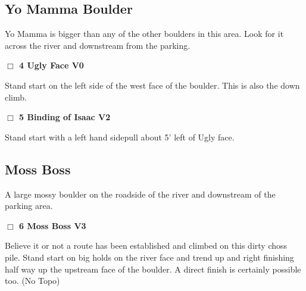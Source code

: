 \begin{multicols}{2}
\needspace{10em}
\subsection*{Yo Mamma Boulder}\label{bf:Yo Mamma Boulder}

Yo Mamma is bigger than any of the other boulders in this area. Look for it across the river and downstream from the parking.\\



\needspace{2em}
\label{rt:Ugly Face}
\colorbox{green!20}{
\parbox{0.95\linewidth}{
\hspace{-1ex}\textbf{$\Box$
4 Ugly Face V0  \warn
}}}
\begin{adjustwidth}{1.3em}{}			

Stand start on the left side of the west face of the boulder. This is also the down climb.
\end{adjustwidth}




\needspace{2em}
\label{rt:Binding of Isaac}
\colorbox{green!20}{
\parbox{0.95\linewidth}{
\hspace{-1ex}\textbf{$\Box$
5 Binding of Isaac V2  \warn
}}}
\begin{adjustwidth}{1.3em}{}			

Stand start with a left hand sidepull about 5' left of Ugly face.
\end{adjustwidth}





\needspace{10em}
\subsection*{Moss Boss}\label{bf:Moss Boss}

A large mossy boulder on the roadside of the river and downstream of the parking area.\\



\needspace{2em}
\label{rt:Moss Boss}
\colorbox{green!20}{
\parbox{0.95\linewidth}{
\hspace{-1ex}\textbf{$\Box$
6 Moss Boss V3  
}}}
\begin{adjustwidth}{1.3em}{}			

Believe it or not a route has been established and climbed on this dirty choss pile. Stand start on big holds on the river face and trend up and right finishing half way up the upstream face of the boulder. A direct finish is certainly possible too.
  (No Topo)
\end{adjustwidth}




	\end{multicols}
